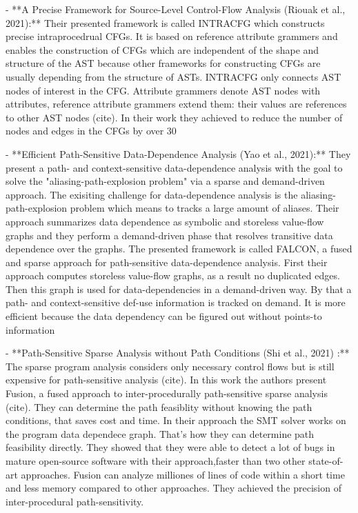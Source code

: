 - **A Precise Framework for Source-Level Control-Flow Analysis (Riouak et al., 2021):** Their presented framework is called INTRACFG which constructs precise intraprocedrual CFGs. It is based on reference attribute grammers and enables the construction of CFGs which are independent of the shape and structure of the AST because other frameworks for constructing CFGs are usually depending from the structure of ASTs. INTRACFG only connects AST nodes of interest in the CFG.
Attribute grammers denote AST nodes with attributes, reference attribute grammers extend them: their values are references to other AST nodes (cite). 
In their work they achieved to reduce the number of nodes and edges in the CFGs by over 30%

- **Efficient Path-Sensitive Data-Dependence Analysis (Yao et al., 2021):** They present a path- and context-sensitive data-dependence analysis with the goal to solve the "aliasing-path-explosion problem" via a sparse and demand-driven approach. The exisiting challenge for data-dependence analysis is the aliasing-path-explosion problem which means to tracks a large amount of aliases. Their approach summarizes data dependence as symbolic and storeless value-flow graphs and they perform a demand-driven phase that resolves transitive data dependence over the graphs. The presented framework is called FALCON, a fused and sparse approach for path-sensitive data-dependence analysis. First their approach computes storeless value-flow graphs, as a result no duplicated edges. Then this graph is used for data-dependencies in a demand-driven way. By that a path- and context-sensitive def-use information is tracked on demand. It is more efficient because the data dependency can be figured out without points-to information 

- **Path-Sensitive Sparse Analysis without Path Conditions (Shi et al., 2021) :** The sparse program analysis considers only necessary control flows but is still expensive for path-sensitive analysis (cite). In this work the authors present Fusion, a fused approach to inter-procedurally path-sensitive sparse analysis (cite). They can determine the path feasiblity without knowing the path conditions, that saves cost and time. In their approach the SMT solver works on the program data dependece graph. That's how they can determine path feasibility directly.
They showed that they were able to detect a lot of bugs in mature open-source software with their approach,faster than two other state-of-art approaches. Fusion can analyze milliones of lines of code within a short time and less memory compared to other approaches. They achieved the precision of inter-procedural path-sensitivity.
